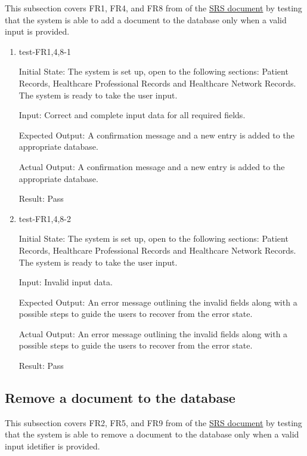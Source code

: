 \documentclass[12pt, titlepage]{article}
\begin{document}
This subsection covers FR1, FR4, and FR8 from of the \href{https://github.com/Inreet-Kaur/capstone/blob/main/docs/SRS/SRS.pdf}{SRS document} by testing that the system is able to add a document to the database only when a valid input is provided.

\begin{enumerate}

  \item{test-FR1,4,8-1} \label{test-FR1,4,8-1}
  
  Initial State: The system is set up, open to the following sections: Patient Records, Healthcare Professional Records and Healthcare Network Records. The system is ready to take the user input.

  Input: Correct and complete input data for all required fields.

  Expected Output: A confirmation message and a new entry is added to the appropriate database.

  Actual Output: A confirmation message and a new entry is added to the appropriate database.

  Result: Pass


  \item{test-FR1,4,8-2} \label{test-FR1,4,8-2}

  Initial State: The system is set up, open to the following sections: Patient Records, Healthcare Professional Records and Healthcare Network Records. The system is ready to take the user input.

  Input: Invalid input data.

  Expected Output: An error message outlining the invalid fields along with a possible steps to guide the users to recover from the error state.

  Actual Output: An error message outlining the invalid fields along with a possible steps to guide the users to recover from the error state.

  Result: Pass

\end{enumerate}

\subsection{Remove a document to the database} \label{section:3.2}

This subsection covers FR2, FR5, and FR9 from of the \href{https://github.com/Inreet-Kaur/capstone/blob/main/docs/SRS/SRS.pdf}{SRS document} by testing that the system is able to remove a document to the database only when a valid input idetifier is provided.
\end{document}
